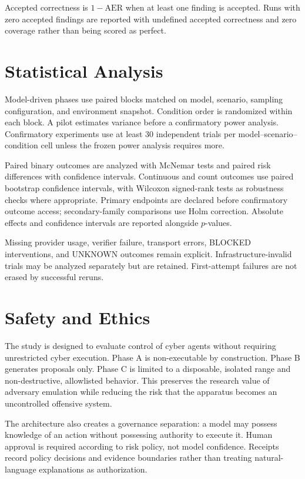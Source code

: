 \documentclass[conference]{IEEEtran}
\begin{document}
Accepted correctness is $1-\mathrm{AER}$ when at least one finding is accepted. Runs with zero accepted findings are reported with undefined accepted correctness and zero coverage rather than being scored as perfect.

\section{Statistical Analysis}
Model-driven phases use paired blocks matched on model, scenario, sampling configuration, and environment snapshot. Condition order is randomized within each block. A pilot estimates variance before a confirmatory power analysis. Confirmatory experiments use at least 30 independent trials per model--scenario--condition cell unless the frozen power analysis requires more.

Paired binary outcomes are analyzed with McNemar tests and paired risk differences with confidence intervals. Continuous and count outcomes use paired bootstrap confidence intervals, with Wilcoxon signed-rank tests as robustness checks where appropriate. Primary endpoints are declared before confirmatory outcome access; secondary-family comparisons use Holm correction. Absolute effects and confidence intervals are reported alongside $p$-values.

Missing provider usage, verifier failure, transport errors, BLOCKED interventions, and UNKNOWN outcomes remain explicit. Infrastructure-invalid trials may be analyzed separately but are retained. First-attempt failures are not erased by successful reruns.

\section{Safety and Ethics}
The study is designed to evaluate control of cyber agents without requiring unrestricted cyber execution. Phase A is non-executable by construction. Phase B generates proposals only. Phase C is limited to a disposable, isolated range and non-destructive, allowlisted behavior. This preserves the research value of adversary emulation while reducing the risk that the apparatus becomes an uncontrolled offensive system.

The architecture also creates a governance separation: a model may possess knowledge of an action without possessing authority to execute it. Human approval is required according to risk policy, not model confidence. Receipts record policy decisions and evidence boundaries rather than treating natural-language explanations as authorization.
\end{document}
